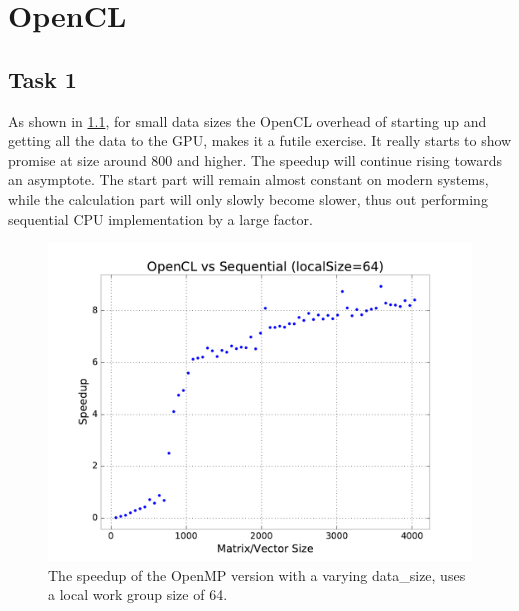 \documentclass[final]{report}
\begin{document}
\chapter{OpenCL}

\section{Task 1}
As shown in \cref{fig:opencl-data-size-sweep}, for small data sizes the OpenCL overhead of starting up and getting all the data to the GPU, makes it a futile exercise.
It really starts to show promise at size around 800 and higher.
The speedup will continue rising towards an asymptote.
The start part will remain almost constant on modern systems, while the calculation part will only slowly become slower, thus out performing sequential CPU implementation by a large factor.
\begin{figure}[H]
\centering
    \includegraphics[width=\linewidth]{resources/opencl-data-size-sweep.pdf}
    \caption{The speedup of the OpenMP version with a varying data\_size, uses a local work group size of 64.}
    \label{fig:opencl-data-size-sweep}
\end{figure}
\end{document}

